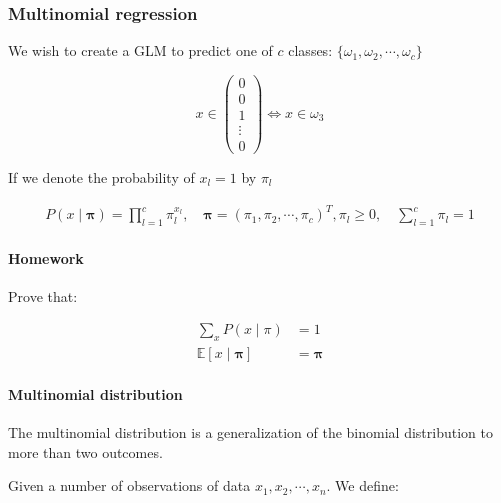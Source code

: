 \subsubsection{Multinomial regression}

We wish to create a GLM to predict one of $c$ classes: $\{ \omega_1, \omega_2, \cdots, \omega_c\}$

\begin{equation}
  x \in \begin{pmatrix}
    0 \\
    0 \\
    1 \\
    \vdots \\
    0
  \end{pmatrix} \Longleftrightarrow x \in \omega_3
  \tag {one-hot encoding}
\end{equation}

If we denote the probability of $x_l = 1$ by $\pi_l$

\begin{align*}
  P(x \mid \boldsymbol\pi) = \prod_{l=1}^c \pi_l^{x_l},\quad
  \boldsymbol{\pi} = (\pi_1, \pi_2, \cdots, \pi_c)^T,
  \pi_l \geq 0,\quad \sum_{l=1}^c \pi_l = 1
\end{align*}

\paragraph{Homework} Prove that:

\begin{align*}
  \sum_x P(x \mid \pi) &= 1 \\
  \mathds{E}[x \mid \boldsymbol\pi] &= \boldsymbol\pi
\end{align*}

\paragraph{Multinomial distribution}
The multinomial distribution is a generalization of the binomial distribution to more than two outcomes.

Given a number of observations of data $x_1, x_2, \cdots, x_n$. We define:



